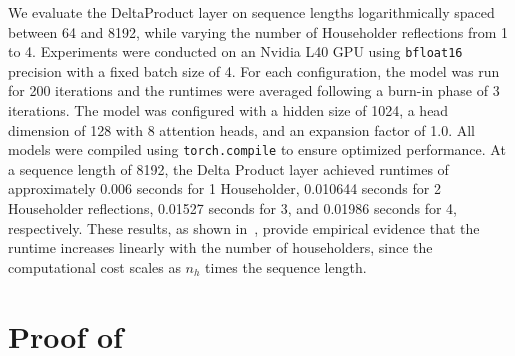 \documentclass{article} %
\begin{document}
We evaluate the DeltaProduct layer on sequence lengths logarithmically spaced between 64 and 8192, while varying the number of Householder reflections from 1 to 4. Experiments were conducted on an Nvidia L40 GPU using \texttt{bfloat16} precision with a fixed batch size of 4. For each configuration, the model was run for 200 iterations and the runtimes were averaged following a burn-in phase of 3 iterations. The model was configured with a hidden size of 1024, a head dimension of 128 with 8 attention heads, and an expansion factor of 1.0. All models were compiled using \texttt{torch.compile} to ensure optimized performance. At a sequence length of 8192, the Delta Product layer achieved runtimes of approximately 0.006 seconds for 1 Householder, 0.010644 seconds for 2 Householder reflections, 0.01527 seconds for 3, and 0.01986 seconds for 4, respectively. These results, as shown in~, provide empirical evidence that the runtime increases linearly with the number of householders, since the computational cost scales as $n_h$ times the sequence length.



\section{Proof of }\label{sec:proof}
\end{document}
